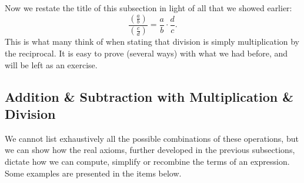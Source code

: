 Now we restate the title of this subsection in light of
all that  we showed earlier:
\begin{equation}\frac{\left(\frac{a}b\right)}{\left(\frac{c}d\right)}
=\frac{a}b\cdot\frac{d}c.\end{equation}
This is what many think of when stating that
division is simply multiplication
by the reciprocal.  It is easy to prove (several 
ways) with what we had before, and will be left as an exercise.



\subsection{Addition \& Subtraction with Multiplication \& Division}

We cannot list exhaustively all the possible combinations of
these operations, but we can show how the real axioms, further
developed in the previous subsections, dictate how we can compute,
simplify or recombine the terms of an expression.
Some examples are presented in the items below.
